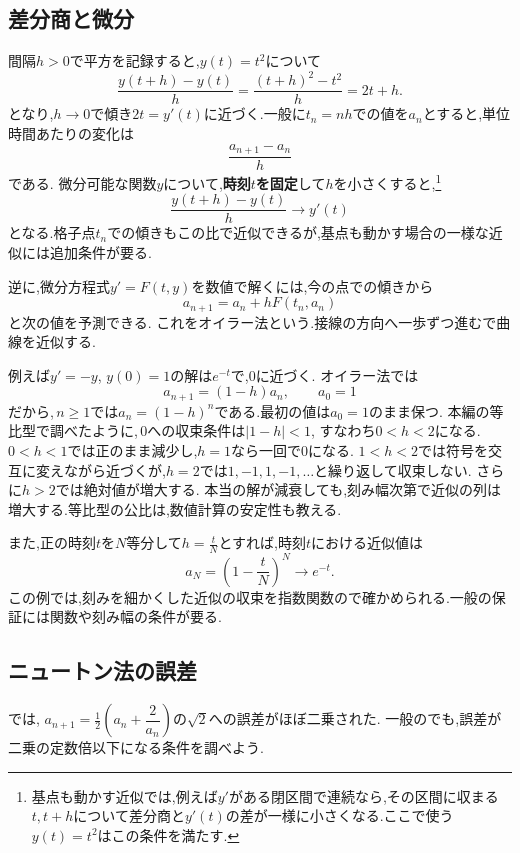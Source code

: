 



\subsection{差分商と微分}
間隔$h>0$で平方を記録すると,$y(t)=t^2$について
\[
  \frac{y(t+h)-y(t)}h
  =\frac{(t+h)^2-t^2}h=2t+h.
\]
となり,$h\to0$で傾き$2t=y'(t)$に近づく.一般に$t_n=nh$での値を$a_n$とすると,単位時間あたりの変化は
\[
  \frac{a_{n+1}-a_n}{h}
\]
である.
微分可能な関数$y$について,\textbf{時刻$t$を固定}して$h$を小さくすると,\footnote{基点も動かす近似では,例えば$y'$がある閉区間で連続なら,その区間に収まる$t,t+h$について差分商と$y'(t)$の差が一様に小さくなる.ここで使う$y(t)=t^2$はこの条件を満たす.}
\[
  \frac{y(t+h)-y(t)}h\longrightarrow y'(t)
\]
となる.格子点$t_n$での傾きもこの比で近似できるが,基点も動かす場合の一様な近似には追加条件が要る.

逆に,微分方程式$y'=F(t,y)$を数値で解くには,今の点での傾きから
\[
  a_{n+1}=a_n+hF(t_n,a_n)
\]
と次の値を予測できる.
これをオイラー法という.接線の方向へ一歩ずつ進むで曲線を近似する.

例えば$y'=-y$, $y(0)=1$の解は$e^{-t}$で,$0$に近づく.
オイラー法では
\[
  a_{n+1}=(1-h)a_n,\qquad a_0=1
\]
だから,\,$n\ge1$では$a_n=(1-h)^n$である.最初の値は$a_0=1$のまま保つ.
本編の等比型で調べたように,\,$0$への収束条件は$|1-h|<1$, すなわち$0<h<2$になる.
$0<h<1$では正のまま減少し,$h=1$なら一回で$0$になる.
$1<h<2$では符号を交互に変えながら近づくが,$h=2$では$1,-1,1,-1,\ldots$と繰り返して収束しない.
さらに$h>2$では絶対値が増大する.
本当の解が減衰しても,刻み幅次第で近似の列は増大する.等比型の公比は,数値計算の安定性も教える.

また,正の時刻$t$を$N$等分して$\displaystyle h=\frac{t}{N}$とすれば,時刻$t$における近似値は
\[
  a_N=\left(1-\frac{t}{N}\right)^N
  \longrightarrow e^{-t}.
\]
この例では,刻みを細かくした近似の収束を指数関数ので確かめられる.一般の保証には関数や刻み幅の条件が要る.

\subsection{ニュートン法の誤差}
では,\BookMathLayout{}{\\}%
$a_{n+1}=\frac12\left(a_n+\dfrac{2}{a_n}\right)$の$\sqrt2$への誤差がほぼ二乗された.
一般のでも,誤差が二乗の定数倍以下になる条件を調べよう.

